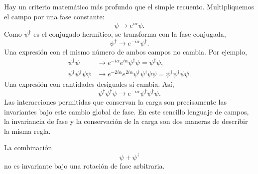 \begin{classroomqa}
\end{classroomqa}

Hay un criterio matemático más profundo que el simple recuento. Multipliquemos el campo por una fase constante:
\begin{equation}
\psi\longrightarrow e^{i\alpha}\psi.
\end{equation}
Como \(\psi^\dagger\) es el conjugado hermítico, se transforma con la fase conjugada,
\begin{equation}
\psi^\dagger\longrightarrow e^{-i\alpha}\psi^\dagger.
\end{equation}
Una expresión con el mismo número de ambos campos no cambia. Por ejemplo,
\begin{align}
\psi^\dagger\psi
&\longrightarrow
e^{-i\alpha}e^{i\alpha}\psi^\dagger\psi
=\psi^\dagger\psi,\\
\psi^\dagger\psi^\dagger\psi\psi
&\longrightarrow
e^{-2i\alpha}e^{2i\alpha}
\psi^\dagger\psi^\dagger\psi\psi
=\psi^\dagger\psi^\dagger\psi\psi.
\end{align}
Una expresión con cantidades desiguales sí cambia. Así,
\begin{equation}
\psi^\dagger\psi^\dagger\psi
\longrightarrow
e^{-i\alpha}\psi^\dagger\psi^\dagger\psi.
\end{equation}
Las interacciones permitidas que conservan la carga son precisamente las invariantes bajo este cambio global de fase. En este sencillo lenguaje de campos, la invariancia de fase y la conservación de la carga son dos maneras de describir la misma regla.

La combinación
\begin{equation}
\psi+\psi^\dagger
\end{equation}
no es invariante bajo una rotación de fase arbitraria.

\begin{classroomqa}
\end{classroomqa}

